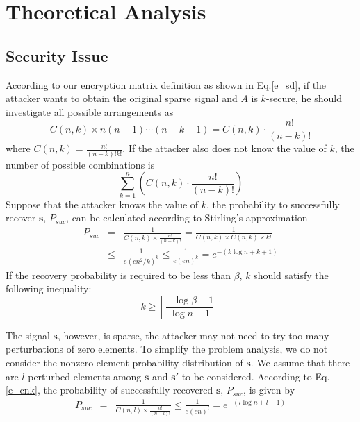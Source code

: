 \documentclass[conference]{IEEEtran}
\begin{document}
\section{Theoretical Analysis}
\subsection{Security Issue}\label{s_sa}
According to our encryption matrix definition as shown in Eq.\ref{e_sd}, if the attacker wants to obtain the original sparse signal and $A$ is $k$-secure, he should investigate all possible  arrangements as
\begin{equation*}
    C(n,k)\times n(n-1)\cdots (n-k+1)= C(n,k)\cdot \frac{n!}{(n-k)!}
\end{equation*}
where $C(n,k)=\frac{n!}{(n-k)!k!}$. If the attacker also does not know the value of $k$, the number of possible combinations is
\begin{equation*}
    \sum_{k=1}^{n}(C(n,k)\cdot \frac{n!}{(n-k)!})
\end{equation*}
Suppose that the attacker knows the value of $k$, the probability to successfully recover  $\mathbf{s}$, $P_{suc}$, can be calculated according to Stirling's approximation \cite{feller1968stirling}
\begin{eqnarray}\label{e_cnk}
    P_{suc} & = & \frac{1}{C(n,k)\times \frac{n!}{(n-k)!}}= \frac{1}{C(n,k)\times C(n,k)\times k!}\nonumber\\
& \leq & \frac{1}{e(en^2/k)^k} \leq  \frac{1}{e(en)^k} =  e^{-(k\log n+k+1)}
\end{eqnarray}
If the recovery probability is required to be less than $\beta$,  $k$ should satisfy the following inequality:
\begin{equation*}
    k\geq \left\lceil\frac{-\log\beta-1}{\log n +1}\right\rceil
\end{equation*}

The signal $\mathbf{s}$, however,  is sparse, the attacker may not need to try too many perturbations of zero elements.
To simplify the problem analysis, we do not consider the nonzero element probability distribution of $\mathbf{s}$. We assume that there are $l$ perturbed elements among $\mathbf{s}$ and $\mathbf{s}'$ to be considered. According to Eq.\ref{e_cnk}, the probability of successfully recovered $\mathbf{s}$, $P_{suc}$, is given by
{\footnotesize
\begin{eqnarray}\label{e_cnt}
    P_{suc} & = & \frac{1}{C(n,l)\times \frac{n!}{(n-l)!}}
     \leq  \frac{1}{e(en)^l}
    =  e^{-(l\log n+l+1)}
\end{eqnarray}}
\end{document}
